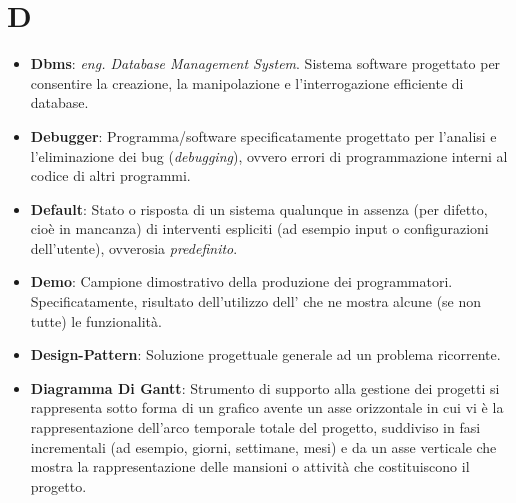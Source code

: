 \section*{D}
\begin{itemize}
	\item
	\textbf{Dbms}: \textit{eng. Database Management System}. Sistema software progettato per consentire la creazione, la manipolazione e l'interrogazione efficiente di database.
	\item
	\textbf{Debugger}: Programma/software specificatamente progettato per l'analisi e l'eliminazione dei bug (\textit{debugging}), ovvero errori di programmazione interni al codice di altri programmi.
	\item
	\textbf{Default}: Stato o risposta di un sistema qualunque in assenza (per difetto, cioè in mancanza) di interventi espliciti (ad esempio input o configurazioni dell'utente), ovverosia \textit{predefinito}.
	\item
	\textbf{Demo}: Campione dimostrativo della produzione dei programmatori. Specificatamente, risultato dell'utilizzo dell' che ne mostra alcune (se non tutte) le funzionalità.
	\item
	\textbf{Design-Pattern}: Soluzione progettuale generale ad un problema ricorrente.
	\item
	\textbf{Diagramma Di Gantt}: Strumento di supporto alla gestione dei progetti si rappresenta sotto forma di un grafico avente un asse orizzontale in cui vi è la rappresentazione dell'arco temporale totale del progetto, suddiviso in fasi incrementali (ad esempio, giorni, settimane, mesi) e da un asse verticale che mostra la rappresentazione delle mansioni o attività che costituiscono il progetto.
\end{itemize}
\newpage